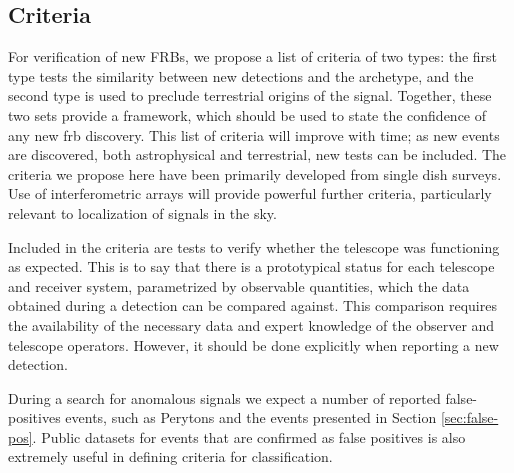 \documentclass[a4paper,fleqn,usenatbib]{mnras}
\newcommand{\GSF}[1]{\noindent\textcolor{green}{GSF:#1}}
\newcommand{\cM}[1]{\textcolor{magenta}{ #1 --M}}
\newcommand{\dcp}[1]{\textcolor{rgb:-green!30!yellow,3;green!30!yellow,2;red,1}{ #1 --D}}
\begin{document}
\subsection{Criteria}
\label{sec:criteria}


For verification of new FRBs, we propose a list of criteria of two types: the
first type tests the similarity between new detections and the archetype, and the
second type is used to preclude terrestrial origins of the signal. Together,
these two sets provide a framework, which should be used to state the confidence
of any new \gls{frb} discovery. This list of criteria will improve with time; as
new events are discovered, both astrophysical and terrestrial, new tests can be
included. The criteria we propose here have been primarily developed from single
dish surveys.  Use of interferometric arrays will provide powerful further
criteria, particularly relevant to localization of signals in the sky.

Included in the criteria are tests to verify whether the telescope was
functioning as expected. This is to say that there is a prototypical status for
each telescope and receiver system, parametrized by observable quantities, which
the data obtained during a detection can be compared against.  This comparison
requires the availability of the necessary data and expert knowledge of the
observer and telescope operators. However, it should be done explicitly when
reporting a new detection.

During a search for anomalous signals we expect a number of reported
false-positives events, such as Perytons \citep{2011ApJ...727...18B} and the
events presented in Section \ref{sec:false-pos}. 
Public datasets for events that are confirmed as false positives is also
extremely useful in defining criteria for classification. 
\end{document}
